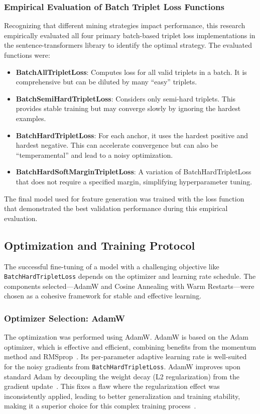 \subsubsection{Empirical Evaluation of Batch Triplet Loss Functions}\label{ch:3.3.2.3}
Recognizing that different mining strategies impact performance, this research empirically evaluated all four primary batch-based triplet loss implementations in the sentence-transformers library to identify the optimal strategy. The evaluated functions were:
\begin{itemize}
    \item \textbf{BatchAllTripletLoss}: Computes loss for all valid triplets in a batch. It is comprehensive but can be diluted by many ``easy'' triplets.
    \item \textbf{BatchSemiHardTripletLoss}: Considers only semi-hard triplets. This provides stable training but may converge slowly by ignoring the hardest examples.
    \item \textbf{BatchHardTripletLoss}: For each anchor, it uses the hardest positive and hardest negative. This can accelerate convergence but can also be ``temperamental'' and lead to a noisy optimization.
    \item \textbf{BatchHardSoftMarginTripletLoss}: A variation of BatchHardTripletLoss that does not require a specified margin, simplifying hyperparameter tuning.
\end{itemize}
The final model used for feature generation was trained with the loss function that demonstrated the best validation performance during this empirical evaluation.

\subsection{Optimization and Training Protocol}\label{ch:3.3.3}
The successful fine-tuning of a model with a challenging objective like \verb|BatchHardTripletLoss| depends on the optimizer and learning rate schedule. The components selected---AdamW and Cosine Annealing with Warm Restarts---were chosen as a cohesive framework for stable and effective learning.{\setlength{\emergencystretch}{5em}\par}

\subsubsection{Optimizer Selection: AdamW}\label{ch:3.3.3.1}
The optimization was performed using AdamW. AdamW is based on the Adam optimizer, which is effective and efficient, combining benefits from the momentum method and RMSprop~\cite{loshchilov2019decoupledweightdecayregularization}. Its per-parameter adaptive learning rate is well-suited for the noisy gradients from \verb|BatchHardTripletLoss|. AdamW improves upon standard Adam by decoupling the weight decay (L2 regularization) from the gradient update~\cite{loshchilov2019decoupledweightdecayregularization}. This fixes a flaw where the regularization effect was inconsistently applied, leading to better generalization and training stability, making it a superior choice for this complex training process~\cite{loshchilov2019decoupledweightdecayregularization}.

